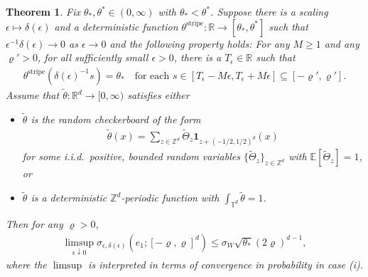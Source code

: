 \documentclass[12pt]{amsart}
\newtheorem{theorem}{Theorem}
\begin{document}
	\begin{theorem} \label{T: general rare events} Fix $\theta_{*}, \theta^{*} \in (0,\infty)$ with $\theta_{*} < \theta^{*}$.  Suppose there is a scaling $\epsilon \mapsto \delta(\epsilon)$ and a  deterministic function $\theta^{\text{stripe}} : \mathbb{R} \to [\theta_{*},\theta^{*}]$ such that $\epsilon^{-1} \delta(\epsilon) \to 0$ as $\epsilon \to 0$ and the following property holds: For any $M \geq 1$ and any $\varrho' > 0$, for all sufficiently small $\epsilon > 0$, there is a $T_{\epsilon} \in \mathbb{R}$ such that 
		\begin{align} \label{E: stripe condition}
			\theta^{\text{stripe}}( \delta(\epsilon)^{-1} s ) = \theta_{*} \quad \text{for each} \, \, s \in [ T_{\epsilon} - M \epsilon, T_{\epsilon} + M \epsilon ] \subseteq [-\varrho', \varrho'].
		\end{align}
	Assume that $\tilde{\theta} : \mathbb{R}^{d} \to [0,\infty)$ satisfies either
		\begin{itemize}
			\item[(i)] $\tilde{\theta}$ is the random checkerboard of the form
				\begin{align*}
					\tilde{\theta}(x) = \sum_{ z \in \mathbb{Z}^{d} } \tilde{\Theta}_{z} \mathbf{1}_{z + (-1/2,1/2)^{d} }(x)
				\end{align*}
			for some i.i.d.\ positive, bounded random variables $\{ \tilde{\Theta}_{z} \}_{z \in \mathbb{Z}^{d}}$ with $\mathbb{E} [ \tilde{\Theta}_{z} ] = 1$, or 
			\item[(ii)] $\tilde{\theta}$ is a deterministic $\mathbb{Z}^{d}$-periodic function with $\int_{\mathbb{T}^{d}} \tilde{\theta} = 1$.
		\end{itemize}
	Then for any $\varrho > 0$,
		\begin{align*}
			\limsup_{ \epsilon \downarrow 0 } \sigma_{ \epsilon, \delta(\epsilon) } ( e_{1} ; [-\varrho,\varrho]^{d} ) \leq \sigma_{W} \sqrt{ \theta_{*} } (2\varrho)^{d-1},
		\end{align*}
	where the $\limsup$ is interpreted in terms of convergence in probability in case (i).
	\end{theorem}
\end{document}
